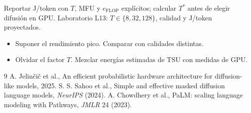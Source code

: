 \documentclass[11pt,a4paper]{article}
\begin{document}
\begin{aplicacion}
Reportar J/token con $T$, MFU y $e_{\text{FLOP}}$ explícitos; calcular $T^\ast$ antes de elegir difusión en GPU. Laboratorio L13: $T\in\{8,32,128\}$, calidad y J/token proyectados.
\end{aplicacion}

\begin{error}
\begin{itemize}[nosep]
\item Suponer el rendimiento pico. \quad Comparar con calidades distintas.
\item Olvidar el factor $T$. \quad Mezclar energías estimadas de TSU con medidas de GPU.
\end{itemize}
\end{error}

\begin{thebibliography}{9}\small
{} A. Jelinčič et al., An efficient probabilistic hardware architecture for diffusion-like models, 2025.
 S. S. Sahoo et al., Simple and effective masked diffusion language models, \emph{NeurIPS} (2024).
 A. Chowdhery et al., PaLM: scaling language modeling with Pathways, \emph{JMLR} 24 (2023).
\end{thebibliography}
\end{document}
